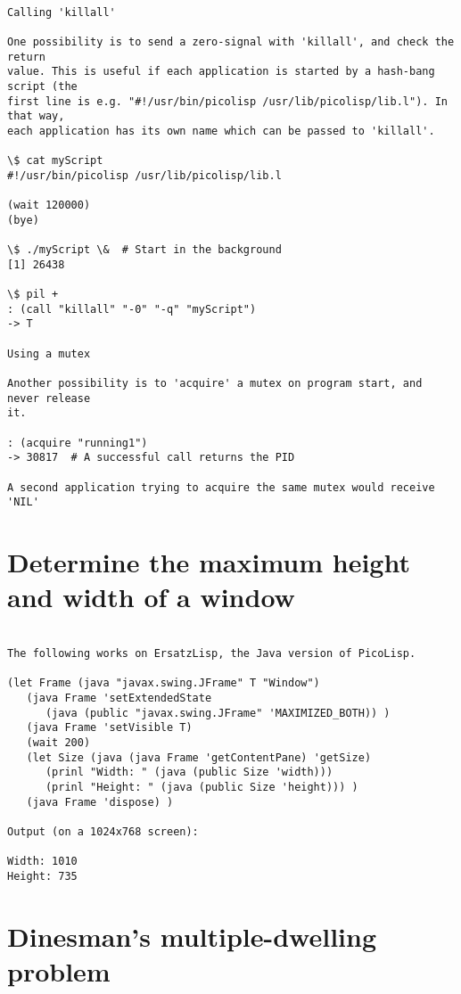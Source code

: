 \begin{verbatim}

Calling 'killall'

One possibility is to send a zero-signal with 'killall', and check the return
value. This is useful if each application is started by a hash-bang script (the
first line is e.g. "#!/usr/bin/picolisp /usr/lib/picolisp/lib.l"). In that way,
each application has its own name which can be passed to 'killall'.

\$ cat myScript
#!/usr/bin/picolisp /usr/lib/picolisp/lib.l

(wait 120000)
(bye)

\$ ./myScript \&  # Start in the background
[1] 26438

\$ pil +
: (call "killall" "-0" "-q" "myScript")
-> T

Using a mutex

Another possibility is to 'acquire' a mutex on program start, and never release
it.

: (acquire "running1")
-> 30817  # A successful call returns the PID

A second application trying to acquire the same mutex would receive 'NIL'

\end{verbatim}

\section*{Determine the maximum height and width of a window}

\begin{verbatim}

The following works on ErsatzLisp, the Java version of PicoLisp.

(let Frame (java "javax.swing.JFrame" T "Window")
   (java Frame 'setExtendedState
      (java (public "javax.swing.JFrame" 'MAXIMIZED_BOTH)) )
   (java Frame 'setVisible T)
   (wait 200)
   (let Size (java (java Frame 'getContentPane) 'getSize)
      (prinl "Width: " (java (public Size 'width)))
      (prinl "Height: " (java (public Size 'height))) )
   (java Frame 'dispose) )

Output (on a 1024x768 screen):

Width: 1010
Height: 735

\end{verbatim}

\section*{Dinesman's multiple-dwelling problem}


